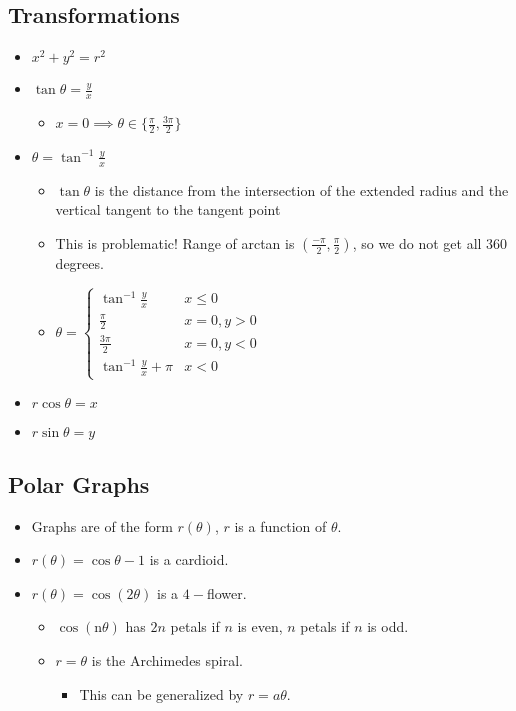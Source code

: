 \documentclass[12pt]{article}
\theoremstyle{plain} %
\theoremstyle{definition}
\theoremstyle{definition}
\theoremstyle{definition}
\theoremstyle{remark}
\begin{document}
\subsection{Transformations}
\begin{itemize}
    \item $x^2+y^2=r^2$
    \item $\tan{\theta} = \frac{y}{x}$
    \begin{itemize}
        \item $x=0 \implies \theta \in \{\frac{\pi}{2}, \frac{3\pi}{2}\}$
    \end{itemize}
    \item $\theta = \tan^{-1}{\frac{y}{x}}$
    \begin{itemize}
        \item $\tan{\theta}$ is the distance from the intersection of the extended radius and the vertical tangent to the tangent point
        \item This is problematic! Range of arctan is $(\frac{-\pi}{2},\frac{\pi}{2})$, so we do not get all $360$ degrees.
        \item $ \theta = \begin{cases}
            \tan^{-1}{\frac{y}{x}} & x\leq 0 \\
            \frac{\pi}{2} & x=0,y>0 \\
            \frac{3\pi}{2} & x=0,y<0 \\
            \tan^{-1}{\frac{y}{x}} + \pi & x < 0
            \end{cases}
        $
    \end{itemize}
    \item $r\cos{\theta} = x$
    \item $r\sin{\theta} = y$
\end{itemize}

\subsection{Polar Graphs}
\begin{itemize}
    \item Graphs are of the form $r(\theta)$, $r$ is a function of $\theta$.
    \item $r(\theta) = \cos{\theta}-1$ is a cardioid.
    \item $r(\theta)=\cos{(2\theta)}$ is a $4-$flower.
    \begin{itemize}
        \item $\cos{(\text{n}\theta)}$ has $2n$ petals if $n$ is even, $n$ petals if $n$ is odd.
    \item $r = \theta$ is the Archimedes spiral.
    \begin{itemize}
        \item This can be generalized by $r = a\theta$.
    \end{itemize}
    \end{itemize}
\end{itemize}
\end{document}
